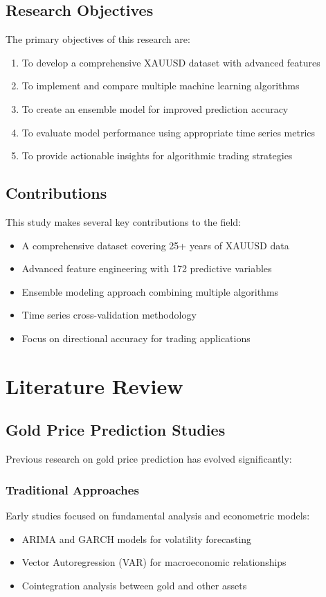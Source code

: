 \documentclass[12pt,a4paper]{article}
\begin{document}
\subsection{Research Objectives}

The primary objectives of this research are:
\begin{enumerate}
    \item To develop a comprehensive XAUUSD dataset with advanced features
    \item To implement and compare multiple machine learning algorithms
    \item To create an ensemble model for improved prediction accuracy
    \item To evaluate model performance using appropriate time series metrics
    \item To provide actionable insights for algorithmic trading strategies
\end{enumerate}

\subsection{Contributions}

This study makes several key contributions to the field:
\begin{itemize}
    \item A comprehensive dataset covering 25+ years of XAUUSD data
    \item Advanced feature engineering with 172 predictive variables
    \item Ensemble modeling approach combining multiple algorithms
    \item Time series cross-validation methodology
    \item Focus on directional accuracy for trading applications
\end{itemize}

\section{Literature Review}

\subsection{Gold Price Prediction Studies}

Previous research on gold price prediction has evolved significantly:

\subsubsection{Traditional Approaches}
Early studies focused on fundamental analysis and econometric models:
\begin{itemize}
    \item ARIMA and GARCH models for volatility forecasting \cite{tsamouris2007futures}
    \item Vector Autoregression (VAR) for macroeconomic relationships \cite{joy2005gold}
    \item Cointegration analysis between gold and other assets \cite{wang2004gold}
\end{itemize}
\end{document}
